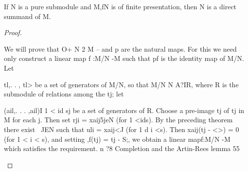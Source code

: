 \begin{theorem}[Theorem 7.14]\label{mcrt-auto-theorem-7-14}\uses{}
\begin{mathematicalrecord}
If N is a pure submodule and M,fN is of finite presentation,
 then N is a direct summand of M.
\end{mathematicalrecord}
\end{theorem}
\begin{proof}
\begin{mathematicalrecord}
We will prove that O+ N 2 M --%
 and p are the natural maps. For this we need only construct a linear map
f :M/N -M         such that pf is the identity map of M/N. Let {tl,. . , tl>
 be a set of generators of M/N, so that M/N N A?IR, where R is the
 submodule of relations among the tj; let {(ail,. . . ,ail)I 1 < id sj be a
 set of generators of R. Choose a pre-image tj of tj in M for each j. Then
 set rji = xaij5jeN (for 1 <ids).    By the preceding theorem there exist
 ~JEN such that uli = xaij<J (for 1 d i <s). Then xaij(tj - <>) = 0 (for
1 < i < s), and setting ,f(tj) = tj - S;, we obtain a linear mapf:M/N     -M
which satisfies the requirement.       n
?8        Completion and the Artin-Rees       lemma                               55

}}
\end{mathematicalrecord}
\end{proof}
